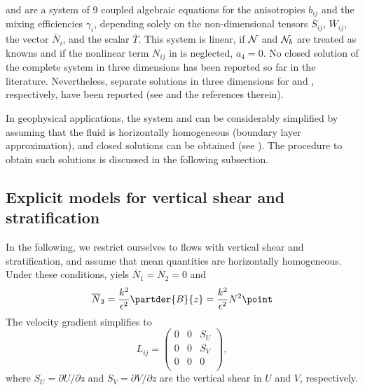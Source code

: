  and  are a system of 9 coupled algebraic 
equations for the anisotropies $b_{ij}$ and the mixing efficiencies
$\gamma_i$, depending solely on the non-dimensional tensors $\overline{S}_{ij}$,
$\overline{W}_{ij}$, the vector $\overline{N}_{i}$, and the scalar 
$\overline{T}$. This system is linear, if ${\cal N}$ and ${\cal N}_b$ are 
treated as knowns and if the nonlinear term $N_{ij}$ in
 is neglected, $a_4=0$. No closed solution of the complete
system in three dimensions has been reported so far in the
literature. Nevertheless, separate solutions in three dimensions for
 and , respectively, have been reported (see \cite{Jinetal2003}
and the references therein).

In geophysical applications, the system  and 
can be considerably simplified by assuming that the fluid is
horizontally homogeneous (boundary layer approximation), and closed
solutions can be obtained (see \cite{Chengetal2002}). The procedure to
obtain such solutions is discussed in the following subsection.


\subsection{Explicit models for vertical shear and stratification\label{sec:EASM}}

In the following, we restrict ourselves to flows with vertical shear
and stratification, and assume that mean quantities are horizontally
homogeneous.  Under these conditions,
 yiels $\overline{N}_1=\overline{N}_2=0$ and
\begin{equation}
  \label{NbarVertical}
   \overline{N}_3 =  \dfrac{k^2}{\epsilon^2} \partder{B}{z}
                  =  \dfrac{k^2}{\epsilon^2} N^2
  \point
\end{equation}
The velocity gradient simplifies to
\begin{equation}
  \label{LijVertical}
  L_{ij} = 
  \begin{pmatrix}
            0             &           0             &        S_U          \\
            0             &           0             &        S_V          \\
            0             &           0             &        0            \\
  \end{pmatrix}
  \comma
\end{equation}
where $S_U=\partial U / \partial z$ and $S_V=\partial V / \partial z$ 
are the vertical shear in $U$ and $V$, respectively. 


